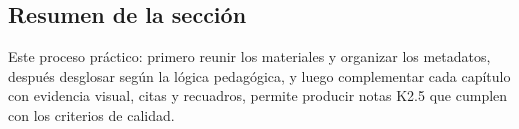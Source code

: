 \subsection{Resumen de la sección}
Este proceso práctico: primero reunir los materiales y organizar los metadatos, después desglosar según la lógica pedagógica, y luego complementar cada capítulo con evidencia visual, citas y recuadros, permite producir notas K2.5 que cumplen con los criterios de calidad.
